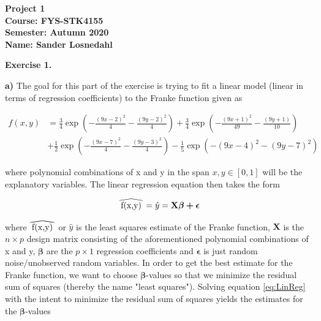 \documentclass[12pt,a4paper]{article}
\newcommand\reallywidehat[1]{%
\savestack{\tmpbox}{\stretchto{%
  \scaleto{%
    \scalerel*[\widthof{\ensuremath{#1}}]{\kern-.6pt\bigwedge\kern-.6pt}%
    {\rule[-\textheight/2]{1ex}{\textheight}}%
  }{\textheight}%
}{0.5ex}}%
\stackon[1pt]{#1}{\tmpbox}%
}
\begin{document}
\begin{center}
\LARGE{\textbf{Project 1}}
\\
\large{\textbf{Course: FYS-STK4155}}
\\
\large{\textbf{Semester: Autumn 2020}}
\\
\large{\textbf{Name: Sander Losnedahl}}
\end{center}


\newpage

\begin{center}
\Large{\textbf{Exercise 1.}}
\end{center}

\noindent \textbf{a)} The goal for this part of the exercise is trying to fit a linear model (linear in terms of regression coefficients) to the Franke function given as

\begin{equation}\label{eq:Franke}
\begin{aligned}
f(x,y) &= \frac{3}{4}\exp{\left(-\frac{(9x-2)^2}{4} - \frac{(9y-2)^2}{4}\right)}+\frac{3}{4}\exp{\left(-\frac{(9x+1)^2}{49}- \frac{(9y+1)}{10}\right)} \\
&+\frac{1}{2}\exp{\left(-\frac{(9x-7)^2}{4} - \frac{(9y-3)^2}{4}\right)} -\frac{1}{5}\exp{\left(-(9x-4)^2 - (9y-7)^2\right) }
\end{aligned}
\end{equation}

\noindent where polynomial combinations of x and y in the span $x,y \in [0,1]$ will be the explanatory variables. The linear regression equation then takes the form

\begin{equation}\label{eq:LinReg}
\begin{aligned}
\reallywidehat{f(x,y)} = \hat{y} = \textbf{X} \boldsymbol{\beta + \epsilon}
\end{aligned}
\end{equation}

\noindent where $\reallywidehat{f(x,y)}$ or $\hat{y}$ is the least squares estimate of the Franke function, $\textbf{X}$ is the $n\times p$ design matrix consisting of the aforementioned polynomial combinations of x and y, $\boldsymbol{\beta}$ are the $p\times 1$ regression coefficients and $\boldsymbol{\epsilon}$ is just random noise/unobserved random variables. In order to get the best estimate for the Franke function, we want to choose $\boldsymbol{\beta}$-values so that we minimize the residual sum of squares (thereby the name "least squares"). Solving equation \ref{eq:LinReg} with the intent to minimize the residual sum of squares yields the estimates for the $\boldsymbol{\beta}$-values 
\end{document}
